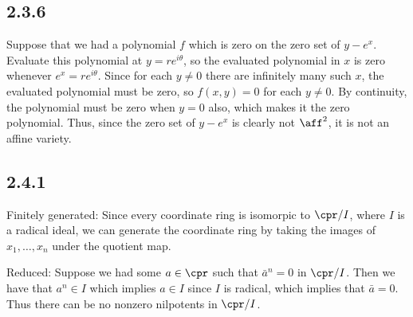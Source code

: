 \documentclass{article}
\begin{document}
\subsection*{2.3.6}
Suppose that we had a polynomial $f$ which is zero on the zero set of $y-e^x$. Evaluate this polynomial at $y=re^{i\theta}$, so the evaluated polynomial in $x$ is zero whenever $e^x=re^{i\theta}$. Since for each $y\neq0$ there are infinitely many such $x$, the evaluated polynomial must be zero, so $f(x,y)=0$ for each $y\neq 0$. By continuity, the polynomial must be zero when $y=0$ also, which makes it the zero polynomial. Thus, since the zero set of $y-e^x$ is clearly not $\aff^2$, it is not an affine variety.
\subsection*{2.4.1}
Finitely generated: Since every coordinate ring is isomorpic to $\cpr/I$, where $I$ is a radical ideal, we can generate the coordinate ring by taking the images of $x_1,\ldots,x_n$ under the quotient map.

Reduced: Suppose we had some $a\in\cpr$ such that $\bar{a}^n=0$ in $\cpr/I$. Then we have that $a^n\in I$ which implies $a\in I$ since $I$ is radical, which implies that $\bar{a}=0$. Thus there can be no nonzero nilpotents in $\cpr/I$.
\end{document}
